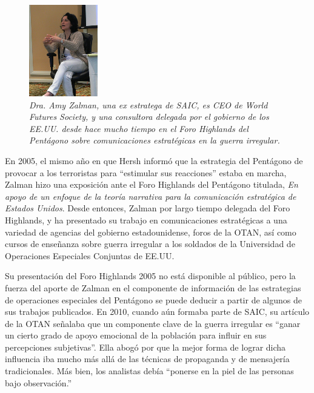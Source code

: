 \documentclass[10pt,a5paper,twoside,spanish,]{book}
\begin{document}
\begin{figure}[htbp]
\centering
\includegraphics{2.5.png}
\caption{\emph{Dra. Amy Zalman, una ex estratega de SAIC, es CEO de
World Futures Society, y una consultora delegada por el gobierno de los
EE.UU. desde hace mucho tiempo en el Foro Highlands del Pentágono sobre
comunicaciones estratégicas en la guerra irregular.}}
\end{figure}

En 2005, el mismo año en que Hersh informó que la estrategia del
Pentágono de provocar a los terroristas para ``estimular sus
reacciones'' estaba en marcha, Zalman hizo una exposición ante el Foro
Highlands del Pentágono titulada, \emph{En apoyo de un enfoque de la
teoría narrativa para la comunicación estratégica de Estados Unidos}.
Desde entonces, Zalman por largo tiempo delegada del Foro Highlands, y
ha presentado su trabajo en comunicaciones estratégicas a una variedad
de agencias del gobierno estadounidense, foros de la OTAN, así como
cursos de enseñanza sobre guerra irregular a los soldados de la
Universidad de Operaciones Especiales Conjuntas de EE.UU.

Su presentación del Foro Highlands 2005 no está disponible al público,
pero la fuerza del aporte de Zalman en el componente de información de
las estrategias de operaciones especiales del Pentágono se puede deducir
a partir de algunos de sus trabajos publicados. En 2010, cuando aún
formaba parte de SAIC, su artículo de la OTAN señalaba que un componente
clave de la guerra irregular es ``ganar un cierto grado de apoyo
emocional de la población para influir en sus percepciones subjetivas''.
Ella abogó por que la mejor forma de lograr dicha influencia iba mucho
más allá de las técnicas de propaganda y de mensajería tradicionales.
Más bien, los analistas debía ``ponerse en la piel de las personas bajo
observación.''
\end{document}
